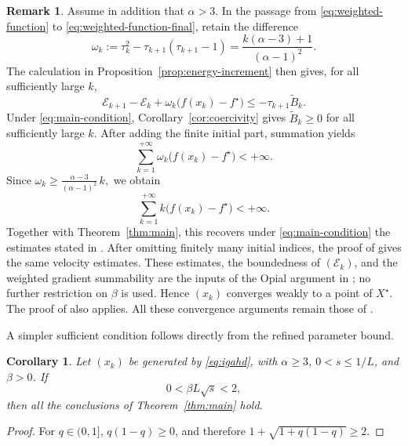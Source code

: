 \documentclass[11pt]{article}
\theoremstyle{plain}
\newtheorem{corollary}[theorem]{Corollary}
\theoremstyle{definition}
\newtheorem{remark}[theorem]{Remark}
\begin{document}
\begin{remark}\normalfont
\label{rem:acfr2023-extension}
Assume in addition that $\alpha>3$. In the passage from
\eqref{eq:weighted-function} to \eqref{eq:weighted-function-final}, retain
the difference
$$
\omega_k
:=\tau_k^2-\tau_{k+1}(\tau_{k+1}-1)
=\frac{k(\alpha-3)+1}{(\alpha-1)^2}.
$$
The calculation in Proposition~\ref{prop:energy-increment} then gives, for
all sufficiently large $k$,
$$
\mathcal E_{k+1}-\mathcal E_k
+\omega_k\bigl(f(x_k)-f^\star\bigr)
\leq-\tau_{k+1}\widetilde B_k.
$$
Under \eqref{eq:main-condition}, Corollary~\ref{cor:coercivity} gives
$\widetilde B_k\geq0$ for all sufficiently large $k$. After adding the
finite initial part, summation yields
$$
\sum_{k=1}^{+\infty}
\omega_k\bigl(f(x_k)-f^\star\bigr)<+\infty.
$$
Since $
\omega_k\geq\frac{\alpha-3}{(\alpha-1)^2}\,k,$ we obtain
$$
\sum_{k=1}^{+\infty}k\bigl(f(x_k)-f^\star\bigr)<+\infty.
$$
Together with Theorem~\ref{thm:main}, this recovers under
\eqref{eq:main-condition} the estimates stated in
\cite[Theorem~4.1]{ACFR2023}. After omitting finitely many initial indices,
the proof of \cite[Theorem~4.2]{ACFR2023} gives the same velocity estimates.
These estimates, the boundedness of $(\mathcal E_k)$, and the weighted
gradient summability are the inputs of the Opial argument in
\cite[Theorem~4.3]{ACFR2023}; no further restriction on $\beta$ is used.
Hence $(x_k)$ converges weakly to a point of $X^\star$. The proof of
\cite[Theorem~4.4]{ACFR2023} also applies. All these convergence arguments
remain those of \cite{ACFR2023}.
\end{remark}


A simpler sufficient condition follows directly from the refined parameter bound.

\begin{corollary}\label{cor:simple-condition}
Let $(x_k)$ be generated by \eqref{eq:igahd}, with $\alpha\geq3$,
$0<s\leq1/L$, and $\beta>0$. If
$$
0<\beta L\sqrt{s}<2,
$$
then all the conclusions of Theorem~\ref{thm:main} hold.
\end{corollary}

\begin{proof}
For $q\in(0,1]$, $q(1-q)\geq0$, and therefore
$1+\sqrt{1+q(1-q)}\geq2$.
\end{proof}
\end{document}
